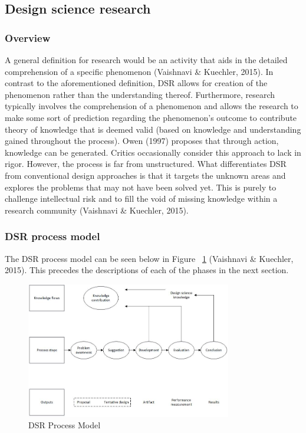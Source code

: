 \subsection{Design science research}
\subsubsection{Overview}
A general definition for research would be an activity that aids in the detailed comprehension of a specific phenomenon (Vaishnavi \& Kuechler, 2015). In contrast to the aforementioned definition, DSR allows for creation of the phenomenon rather than the understanding thereof. Furthermore, research typically involves the comprehension of a phenomenon and allows the research to make some sort of prediction regarding the phenomenon’s outcome to contribute theory of knowledge that is deemed valid (based on knowledge and understanding gained throughout the process). Owen (1997) proposes that through action, knowledge can be generated. Critics occasionally consider this approach to lack in rigor. However, the process is far from unstructured.
What differentiates DSR from conventional design approaches is that it targets the unknown areas and explores the problems that may not have been solved yet. This is purely to challenge intellectual risk and to fill the void of missing knowledge within a research community (Vaishnavi \& Kuechler, 2015).
\subsubsection{DSR process model}
The DSR process model can be seen below in Figure ~\ref{fig:DSR_Process_Model} (Vaishnavi \& Kuechler, 2015). This precedes the descriptions of each of the phases in the next section.
\begin{figure}[ht]
\centering
\includegraphics[width=0.8\textwidth]{Chapter1/Figs/Figure2.jpg}
\caption{DSR Process Model}
\label{fig:DSR_Process_Model}
\end{figure}

